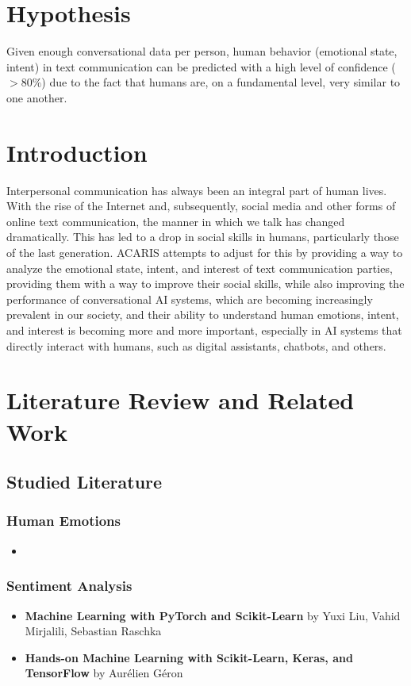 \documentclass{article}
\begin{document}
\begin{itemize}
\section{Hypothesis}
Given enough conversational data per person, human behavior (emotional state, intent) in text communication can be predicted with a high level of confidence ($>80\%$) due to the fact that humans are, on a fundamental level, very similar to one another.

\section{Introduction}
Interpersonal communication has always been an integral part of human lives. With the rise of the Internet and, subsequently, social media and other forms of online text communication, the manner in which we talk has changed dramatically. This has led to a drop in social skills in humans, particularly those of the last generation. ACARIS attempts to adjust for this by providing a way to analyze the emotional state, intent, and interest of text communication parties, providing them with a way to improve their social skills, while also improving the performance of conversational AI systems, which are becoming increasingly prevalent in our society, and their ability to understand human emotions, intent, and interest is becoming more and more important, especially in AI systems that directly interact with humans, such as digital assistants, chatbots, and others.

\section{Literature Review and Related Work}
\subsection{Studied Literature}
\subsubsection{Human Emotions}
\begin{itemize}
	\item 
\end{itemize}
\subsubsection{Sentiment Analysis}
\begin{itemize}
	\item \textbf{Machine Learning with PyTorch and Scikit-Learn} by Yuxi Liu, Vahid Mirjalili, Sebastian Raschka
	\item \textbf{Hands-on Machine Learning with Scikit-Learn, Keras, and TensorFlow} by Aurélien Géron
\end{itemize}


\end{itemize}
\end{document}
